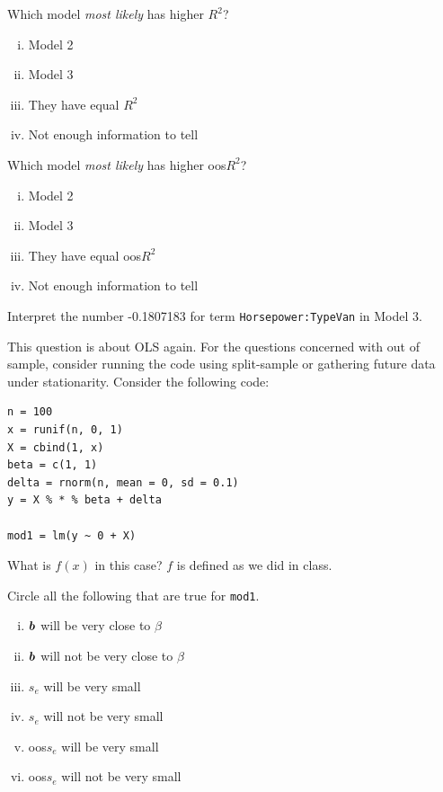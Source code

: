 \documentclass[12pt]{article}
\begin{document}
 Which model \emph{most likely} has higher $R^2$?

\begin{enumerate}[i)]
\item Model 2
\item Model 3
\item They have equal $R^2$
\item Not enough information to tell
\end{enumerate}

 Which model \emph{most likely} has higher oos$R^2$?

\begin{enumerate}[i)]
\item Model 2
\item Model 3
\item They have equal oos$R^2$
\item Not enough information to tell
\end{enumerate}

 Interpret the number -0.1807183 for term \texttt{Horsepower:TypeVan} in Model 3.

\eenum

\problem This question is about OLS again. For the questions concerned with out of sample, consider running the code using split-sample or gathering future data under stationarity. Consider the following code:

\lstset{basicstyle=\normalsize}
\begin{lstlisting}
n = 100
x = runif(n, 0, 1)
X = cbind(1, x)
beta = c(1, 1)
delta = rnorm(n, mean = 0, sd = 0.1)
y = X % * % beta + delta

mod1 = lm(y ~ 0 + X)
\end{lstlisting}

\benum

 What is $f(x)$ in this case? $f$ is defined as we did in class.

 Circle all the following that are true for \texttt{mod1}.

\begin{enumerate}[i)]
\item $\boldsymbol{b}$ will be very close to $\beta$
\item $\boldsymbol{b}$ will not be very close to $\beta$
\item $s_e$ will be very small
\item $s_e$ will not be very small
\item oos$s_e$ will be very small
\item oos$s_e$ will not be very small
\end{enumerate}
\end{document}
